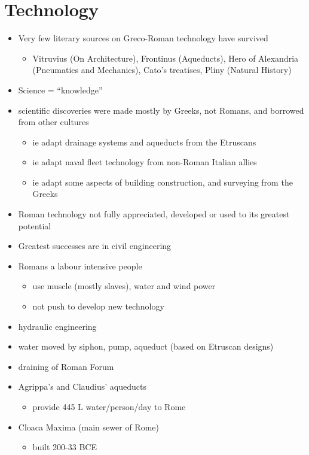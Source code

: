 \documentclass[12pt, twoside]{article}
\begin{document}
\section{Technology}
\begin{itemize}
\item Very few literary sources on Greco-Roman technology have survived
	\begin{itemize}
	\item Vitruvius (On Architecture), Frontinus (Aqueducts), Hero of Alexandria (Pneumatics and Mechanics), Cato's treatises, Pliny (Natural History)
	\end{itemize}
\item Science = “knowledge”
\item scientific discoveries were made mostly by Greeks, not Romans, and borrowed from other cultures
	\begin{itemize}
	\item ie adapt drainage systems and aqueducts from the Etruscans
	\item ie adapt naval fleet technology from non-Roman Italian allies
	\item ie adapt some aspects of building construction, and surveying from the Greeks
	\end{itemize}
\item Roman technology not fully appreciated, developed or used to its greatest potential
\item Greatest successes are in civil engineering
\item Romans a labour intensive people
	\begin{itemize}
	\item use muscle (mostly slaves), water and wind power
	\item not push to develop new technology
	\end{itemize}
\item hydraulic engineering
\item water moved by siphon, pump, aqueduct (based on Etruscan designs)
\item draining of Roman Forum
\item Agrippa's and Claudius' aqueducts
	\begin{itemize}
	\item provide 445 L water/person/day to Rome
	\end{itemize}
\item Cloaca Maxima (main sewer of Rome)
	\begin{itemize}
	\item built 200-33 BCE

\end{itemize}
\end{itemize}
\end{document}
